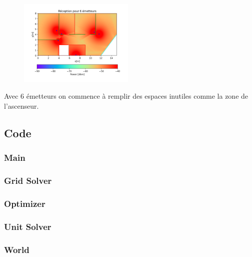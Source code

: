 \documentclass[sn-mathphys-num]{sn-jnl}
\begin{document}
\begin{figure}[H]
    \centering
    \includegraphics[width=0.49\textwidth]{images/optimize/6_dbm.png}
\end{figure}

Avec 6 émetteurs on commence à remplir des espaces inutiles comme la zone de l'ascenseur.

\subsection{Code}

\subsubsection{Main}



\subsubsection{Grid Solver}



\subsubsection{Optimizer}



\subsubsection{Unit Solver}



\subsubsection{World}


\end{document}
